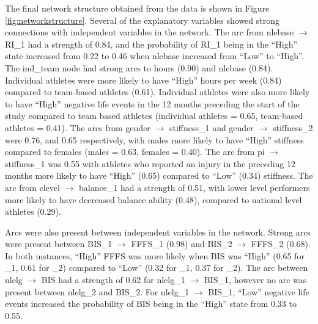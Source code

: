 \documentclass[man,floatsintext]{apa6}
\begin{document}
The final network structure obtained from the data is shown in Figure \ref{fig:networkstructure}. Several of the explanatory variables showed strong connections with independent variables in the network.
The arc from nlebase \(\rightarrow\) RI\_1 had a strength of 0.84, and the probability of RI\_1 being in the \enquote{High} state increased from 0.22 to 0.46 when nlebase increased from \enquote{Low} to \enquote{High}.
The ind\_team node had strong arcs to hours (0.90) and nlebase (0.84).
Individual athletes were more likely to have \enquote{High} hours per week (0.84) compared to team-based athletes (0.61).
Individual athletes were also more likely to have \enquote{High} negative life events in the 12 months preceding the start of the study compared to team based athletes (individual athletes = 0.65, team-based athletes = 0.41).
The arcs from gender \(\rightarrow\) stiffness\_1 and gender \(\rightarrow\) stiffness\_2 were 0.76, and 0.65 respectively, with males more likely to have \enquote{High} stiffness compared to females (males = 0.63, females = 0.40).
The arc from pi \(\rightarrow\) stiffness\_1 was 0.55 with athletes who reported an injury in the preceding 12 months more likely to have \enquote{High} (0.65) compared to \enquote{Low} (0.34) stiffness.
The arc from clevel \(\rightarrow\) balance\_1 had a strength of 0.51, with lower level performers more likely to have decreased balance ability (0.48), compared to national level athletes (0.29).

Arcs were also present between independent variables in the network. Strong arcs were present between BIS\_1 \(\rightarrow\) FFFS\_1 (0.98) and BIS\_2 \(\rightarrow\) FFFS\_2 (0.68).
In both instances, \enquote{High} FFFS was more likely when BIS was \enquote{High} (0.65 for \_1, 0.61 for \_2) compared to \enquote{Low} (0.32 for \_1, 0.37 for \_2).
The arc between nlelg \(\rightarrow\) BIS had a strength of 0.62 for nlelg\_1 \(\rightarrow\) BIS\_1, however no arc was present between nlelg\_2 and BIS\_2.
For nlelg\_1 \(\rightarrow\) BIS\_1, \enquote{Low} negative life events increased the probability of BIS being in the \enquote{High} state from 0.33 to 0.55.
\end{document}
